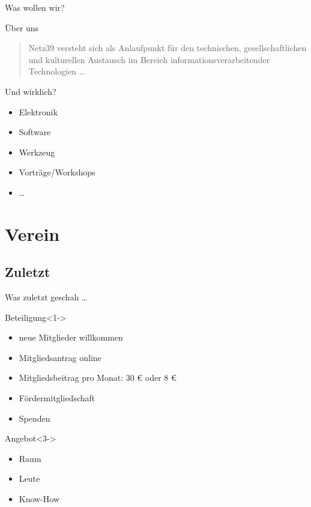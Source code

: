 \documentclass[hyperref={pdfpagelabels=false}]{beamer}
\begin{document}
\begin{frame}{Was wollen wir?}
    \begin{block}{Über uns}
        \begin{quote}
            Netz39 versteht sich als Anlaufpunkt für den technischen,
            gesellschaftlichen und kulturellen Austausch im Bereich
            informationsverarbeitender Technologien …
        \end{quote}
    \end{block}
    \begin{block}{Und wirklich?}
        \begin{itemize}
            \item Elektronik
            \item Software
            \item Werkzeug
            \item Vorträge/Workshops
            \item …
        \end{itemize}
    \end{block}
\end{frame}

\section{Verein}

\subsection{Zuletzt}

\begin{frame}[label=secbaellebad]{Was zuletzt geschah …}
    \begin{block}{Beteiligung}<1->
        \begin{itemize}
            \item neue Mitglieder willkommen
            \item Mitgliedsantrag online
            \item Mitgliedsbeitrag pro Monat: 30 € oder 8 €
            \pause
            \item Fördermitgliedschaft
            \item Spenden
        \end{itemize}
    \end{block}
    \begin{block}{Angebot}<3->
        \begin{itemize}
            \item Raum
            \item Leute
            \item Know-How
        \end{itemize}
    \end{block}
\end{frame}
\end{document}
